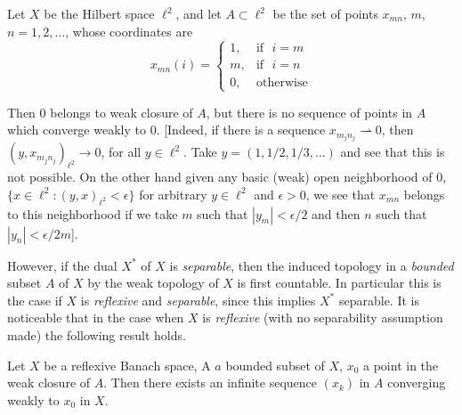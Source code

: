 \begin{example*}
Let $X$ be the Hilbert space $\ell^{2}$, and let $A\subset \ell^{2}$
be the set of points $x_{mn}$, $m$, $n=1,2,\ldots$, whose coordinates
are
$$
x_{mn}(i)=
\begin{cases}
1, & \text{if~ } i=m\\
m, & \text{if~ } i=n\\
0, & \text{otherwise}
\end{cases}
$$

Then $0$ belongs to weak closure of $A$, but there is no sequence of
points in $A$ which converge weakly to $0$. [Indeed, if there is a
  sequence $x_{m_{j}n_{j}}\rightharpoonup 0$, then
  $(y,x_{m_{j}n_{j}})_{\ell^{2}}\to 0$, for all $y\in \ell^{2}$. Take
  $y=(1,1/2,1/3,\ldots)$ and see that this is not possible. On the
  other hand given any basic (weak) open neighborhood of $0$, $\{x\in
  \ell^{2}:(y,x)_{\ell^{2}}<\epsilon\}$ for arbitrary $y\in \ell^{2}$
  and $\epsilon>0$, we see that $x_{mn}$ belongs to this neighborhood
  if we take $m$ such that $|y_{m}|<\epsilon/2$ and then $n$ such that
  $|y_{n}|<\epsilon/2m$]. 
\end{example*}

However, if the dual $X^{*}$ of $X$ is {\em separable}, then the
induced topology in a {\em bounded} subset $A$ of $X$ by the weak
topology of $X$ is first countable. In particular this is the case if
$X$ is {\em reflexive} and {\em separable}, since this implies $X^{*}$
separable. It is noticeable that in the case when $X$ is {\em
  reflexive} (with no separability assumption made) the following
result holds.

\begin{theorem}\label{chap1-thm1.5}
Let $X$ be a reflexive Banach space, A $a$ bounded subset of $X$,
$x_{0}$ a point in the weak closure of $A$. Then there exists an
infinite sequence $(x_{k})$ in $A$ converging weakly to $x_{0}$ in $X$.
\end{theorem}


